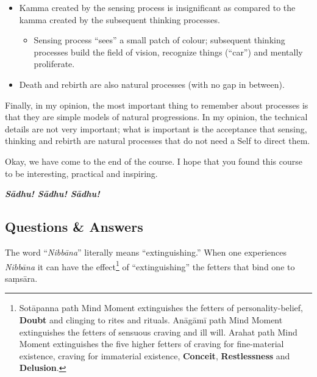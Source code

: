 \begin{itemize}
\item Kamma created by the sensing process is insignificant as compared to the kamma created by the subsequent thinking processes.

\begin{itemize}

\item Sensing process “sees” a small patch of colour; subsequent thinking processes build the field of vision, recognize things (“car”) and mentally proliferate.

\end{itemize}

\item Death and rebirth are also natural processes (with no gap in between).

\end{itemize}

Finally, in my opinion, the most important thing to remember about processes is that they are simple models of natural progressions. In my opinion, the technical details are not very important; what is important is the acceptance that sensing, thinking and rebirth are natural processes that do not need a Self to direct them.

Okay, we have come to the end of the course. I hope that you found this course to be interesting, practical and inspiring.

\begin{center}
\textbf{\textit{Sādhu! Sādhu! Sādhu!}} \\
\end{center}

\newpage

\subsection*{Questions \& Answers}


The word “\textit{Nibbāna}” literally means “extinguishing.” When one experiences \textit{Nibbāna} it can have the effect\footnote{Sotāpanna path Mind Moment extinguishes the fetters of personality-belief, \textbf{Doubt} and clinging to rites and rituals. Anāgāmī path Mind Moment extinguishes the fetters of sensuous craving and ill will. Arahat path Mind Moment extinguishes the five higher fetters of craving for fine-material existence, craving for immaterial existence, \textbf{Conceit}, \textbf{Restlessness} and \textbf{Delusion}.} of “extinguishing” the fetters that bind one to saṃsāra.

